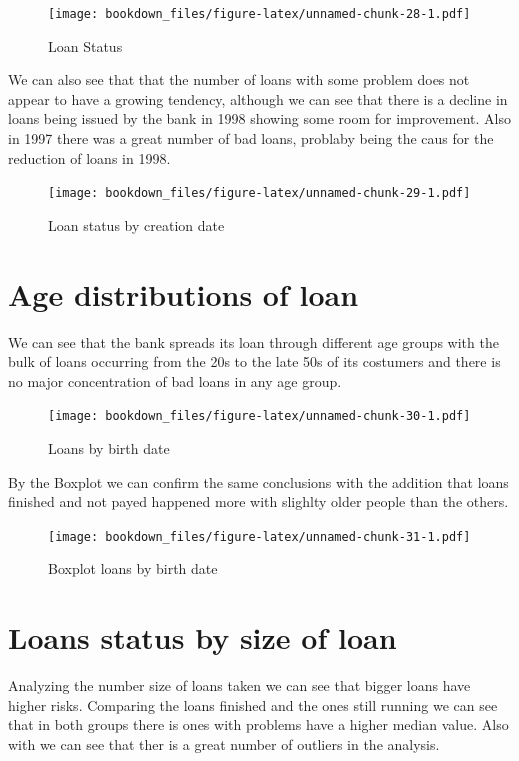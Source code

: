 \documentclass[]{book}
\begin{document}
\begin{figure}
\centering
\texttt{[image: bookdown\_files/figure-latex/unnamed-chunk-28-1.pdf]}
\caption{\label{fig:unnamed-chunk-28}Loan Status}
\end{figure}

We can also see that that the number of loans with some problem does not
appear to have a growing tendency, although we can see that there is a
decline in loans being issued by the bank in 1998 showing some room for
improvement. Also in 1997 there was a great number of bad loans,
problaby being the caus for the reduction of loans in 1998.

\begin{figure}
\centering
\texttt{[image: bookdown\_files/figure-latex/unnamed-chunk-29-1.pdf]}
\caption{\label{fig:unnamed-chunk-29}Loan status by creation date}
\end{figure}

\section{Age distributions of loan}\label{age-distributions-of-loan}

We can see that the bank spreads its loan through different age groups
with the bulk of loans occurring from the 20s to the late 50s of its
costumers and there is no major concentration of bad loans in any age
group.

\begin{figure}
\centering
\texttt{[image: bookdown\_files/figure-latex/unnamed-chunk-30-1.pdf]}
\caption{\label{fig:unnamed-chunk-30}Loans by birth date}
\end{figure}

By the Boxplot we can confirm the same conclusions with the addition
that loans finished and not payed happened more with slighlty older
people than the others.

\begin{figure}
\centering
\texttt{[image: bookdown\_files/figure-latex/unnamed-chunk-31-1.pdf]}
\caption{\label{fig:unnamed-chunk-31}Boxplot loans by birth date}
\end{figure}

\section{Loans status by size of
loan}\label{loans-status-by-size-of-loan}

Analyzing the number size of loans taken we can see that bigger loans
have higher risks. Comparing the loans finished and the ones still
running we can see that in both groups there is ones with problems have
a higher median value. Also with we can see that ther is a great number
of outliers in the analysis.
\end{document}
